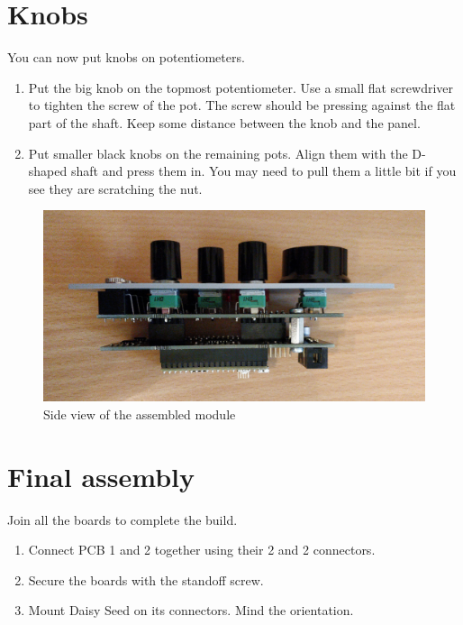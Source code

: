 \documentclass[10pt,a4paper,twocolumn]{article}
\begin{document}
\clearpage

\section{Knobs}

You can now put knobs on potentiometers.

\begin{enumerate}
  \item Put the big knob on the topmost potentiometer. Use a small flat screwdriver to tighten the screw of the pot. The screw should be pressing against the flat part of the shaft. Keep some distance between the knob and the panel.
  \item Put smaller black knobs on the remaining pots. Align them with the D-shaped shaft and press them in. You may need to pull them a little bit if you see they are scratching the nut.
\end{enumerate}

\begin{figure}[p]
  \centering
  \includegraphics[width=\linewidth]{p11.jpg}
  \caption{Side view of the assembled module}
\end{figure}

\section{Final assembly}

Join all the boards to complete the build.

\begin{enumerate}
  \item Connect PCB 1 and 2 together using their 2 and 2 connectors.
  \item Secure the boards with the standoff screw.
  \item Mount Daisy Seed on its connectors. Mind the orientation.
\end{enumerate}
\end{document}
